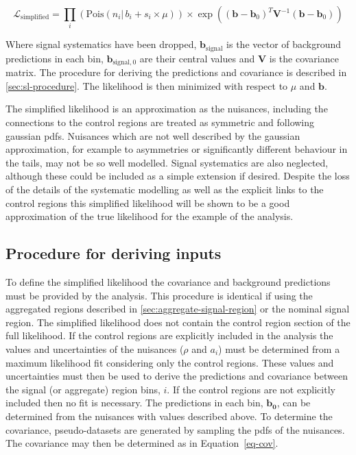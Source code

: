 \begin{equation}
\mathcal{L}_{\mathrm{simplified}}=\prod_i(\mathrm{Pois}(n_{i} |\, b_{i} + s_{i}\times\mu)
)\times\exp((\mathbf{b}-\mathbf{b}_{0})^T\mathbf{V}^{-1}(\mathbf{b}-\mathbf{b}_{0}))
\label{eq:simplified-likelihood}
\end{equation}

Where signal systematics have been dropped, $\mathbf{b}_{\mathrm{signal}}$ is the vector
of background predictions in each bin, $\mathbf{b}_{\mathrm{signal},0}$ are their central values 
and $\mathbf{V}$ is the covariance matrix. The procedure for deriving the predictions and covariance
is described in \ref{sec:sl-procedure}. The likelihood is then minimized with respect to $\mu$ and $\mathbf{b}$.

The simplified likelihood is an approximation as the nuisances, including the connections
to the control regions are treated as symmetric and following gaussian pdfs.
Nuisances which are not well described by the gaussian approximation, for example 
to asymmetries or significantly different behaviour in the tails, may not be so well modelled.
Signal systematics are also neglected, although these could be included as a simple
extension if desired. Despite the loss of the details of the systematic modelling 
as well as the explicit links to the control regions this simplified likelihood will
be shown to be a good approximation of the true likelihood for the example of the
\alphat analysis. 

\subsection{Procedure for deriving inputs}

To define the simplified likelihood the covariance and background predictions must be 
provided by the analysis. This procedure is identical if using the 
aggregated regions described in \ref{sec:aggregate-signal-region} or the nominal signal region. 
The simplified likelihood does not contain the control region 
section of the full likelihood. If the control regions are explicitly included in the analysis
the values and uncertainties of the nuisances ($\rho$ and $a_i$)
must be determined from a maximum likelihood fit considering only the control regions.
These values and uncertainties must then be used to derive the predictions and covariance
between the signal (or aggregate) region bins, $i$. If the control regions are not explicitly 
included then no fit is necessary. The predictions in each bin, $\mathbf{b_0}$, can be 
determined from the nuisances with values described above. To determine the covariance, pseudo-datasets are generated
by sampling the pdfs of the nuisances. The covariance may then be determined as in Equation~\ref{eq-cov}.

